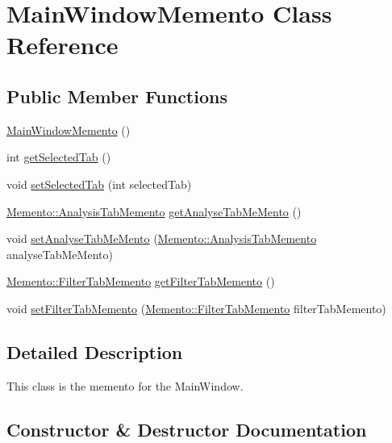 \hypertarget{classMemento_1_1MainWindowMemento}{}\section{Main\+Window\+Memento Class Reference}
\label{classMemento_1_1MainWindowMemento}
\subsection*{Public Member Functions}
\begin{DoxyCompactItemize}
\item 
\hyperlink{classMemento_1_1MainWindowMemento_a2ce9d23f57fc6397812a080c3111d56c}{Main\+Window\+Memento} ()
\item 
int \hyperlink{classMemento_1_1MainWindowMemento_a876003270f9665415d49783d0669511a}{get\+Selected\+Tab} ()
\item 
void \hyperlink{classMemento_1_1MainWindowMemento_a9ec6af835d6fdbf10eb8a6db5ad59578}{set\+Selected\+Tab} (int selected\+Tab)
\item 
\hyperlink{classMemento_1_1AnalysisTabMemento}{Memento\+::\+Analysis\+Tab\+Memento} \hyperlink{classMemento_1_1MainWindowMemento_ad2bac77537b9ed57af42b1c45a6f6cb3}{get\+Analyse\+Tab\+Me\+Mento} ()
\item 
void \hyperlink{classMemento_1_1MainWindowMemento_a1183e7ea9f8a025a42c35e3d9667ad07}{set\+Analyse\+Tab\+Me\+Mento} (\hyperlink{classMemento_1_1AnalysisTabMemento}{Memento\+::\+Analysis\+Tab\+Memento} analyse\+Tab\+Me\+Mento)
\item 
\hyperlink{classMemento_1_1FilterTabMemento}{Memento\+::\+Filter\+Tab\+Memento} \hyperlink{classMemento_1_1MainWindowMemento_aca564eecb180bc19d899b14c9ebe5486}{get\+Filter\+Tab\+Memento} ()
\item 
void \hyperlink{classMemento_1_1MainWindowMemento_aabc5961524bfb567d2f7f5bdf79e6661}{set\+Filter\+Tab\+Memento} (\hyperlink{classMemento_1_1FilterTabMemento}{Memento\+::\+Filter\+Tab\+Memento} filter\+Tab\+Memento)
\end{DoxyCompactItemize}


\subsection{Detailed Description}
This class is the memento for the Main\+Window. 

\subsection{Constructor \& Destructor Documentation}
\hypertarget{classMemento_1_1MainWindowMemento_a2ce9d23f57fc6397812a080c3111d56c}{}
